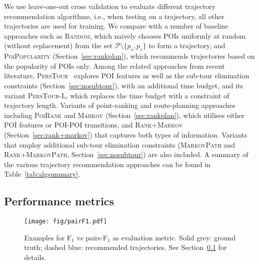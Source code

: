 We use leave-one-out cross validation to evaluate different trajectory recommendation algorithms,
i.e., when testing on a trajectory, all other trajectories are used for training.
We compare with a number of baseline approaches such as \textsc{Random},
which naively chooses POIs uniformly at random (without replacement) from the set $\mathcal{P} \setminus \{p_s, p_e \}$ to form a trajectory,
and \textsc{PoiPopularity} (Section~\ref{sec:rankplan}), which recommends trajectories based on the popularity of POIs only.
Among the related approaches from recent literature,
\textsc{PersTour}~\cite{ijcai15} explores POI features as well as the sub-tour elimination constraints (Section~\ref{sec:nosubtour}),
with an additional time budget, and its variant \textsc{PersTour-L},
which replaces the time budget with a constraint of trajectory length.
Variants of point-ranking and route-planning approaches including \textsc{PoiRank} and \textsc{Markov} (Section~\ref{sec:rankplan}),
which utilises either POI features or POI-POI transitions,
and \textsc{Rank+Markov} (Section~\ref{sec:rank+markov}) that captures both types of information. %
Variants that employ additional sub-tour elimination constraints
(\textsc{MarkovPath} and \textsc{Rank+MarkovPath}, Section~\ref{sec:nosubtour}) are also included.
A summary of the various trajectory recommendation approaches can be found in Table~\ref{tab:algsummary}.






\subsection{Performance metrics}
\label{sec:metric}

\begin{figure}[t]
	\centering
	\texttt{[image: fig/pairF1.pdf]}
	\caption{Examples for F$_1$ vs pairs-F$_1$ as evaluation metric.
Solid grey: ground truth; dashed blue: recommended trajectories. See Section~\ref{sec:metric} for details.}
	\label{fig:pairf1}\captionmoveup
\end{figure}

